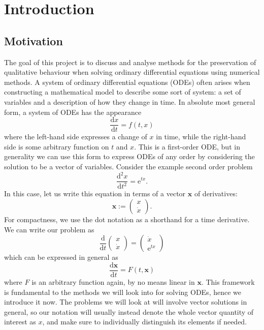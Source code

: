 \documentclass{report}
\theoremstyle{exampstyle} \newtheorem{example}[theorem]{Example}
\theoremstyle{exampstyle} \newtheorem{remark}[theorem]{Remark}
\theoremstyle{exampstyle} \newtheorem{definition}[theorem]{Definition}
\theoremstyle{exampstyle} \newtheorem{lemma}[theorem]{Lemma}
\begin{document}
\chapter{Introduction}

\section{Motivation}

The goal of this project is to discuss and analyse methods for the preservation of qualitative behaviour when solving ordinary differential equations using numerical methods.
A system of ordinary differential equations (ODEs) often arises when constructing a mathematical model to describe some sort of system: a set of variables and a description of how they change in time.
In absolute most general form, a system of ODEs has the appearance
\begin{equation}
    \frac{\mathrm{d}x}{\mathrm{d}t} = f(t,x)
\end{equation}
where the left-hand side expresses a change of $x$ in time, while the right-hand side is some arbitrary function on $t$ and $x$.
This is a first-order ODE, but in generality we can use this form to express ODEs of any order by considering the solution to be a vector of variables.
Consider the example second order problem
\begin{equation*}
    \frac{\mathrm{d}^2 x}{\mathrm{d}t^2} = \mathrm{e}^{tx}.
\end{equation*}
In this case, let us write this equation in terms of a vector $\mathbf{x}$ of derivatives:
\begin{equation*}
    \mathbf{x} := \begin{pmatrix}
        x \\
        \dot{x}
    \end{pmatrix}.
\end{equation*}
For compactness, we use the dot notation as a shorthand for a time derivative.
We can write our problem as
\begin{equation*}
    \frac{\mathrm{d}}{\mathrm{d}t} \begin{pmatrix}
        x \\
        \dot{x}
    \end{pmatrix} = \begin{pmatrix}
        \dot{x} \\
        \mathrm{e}^{tx}
    \end{pmatrix}
\end{equation*}
which can be expressed in general as
\begin{equation*}
    \frac{\mathrm{d}\mathbf{x}}{\mathrm{d}t} = F(t,\mathbf{x})
\end{equation*}
where $F$ is an arbitrary function again, by no means linear in $\mathbf{x}$.
This framework is fundamental to the methods we will look into for solving ODEs, hence we introduce it now.
The problems we will look at will involve vector solutions in general, so our notation will usually instead denote the whole vector quantity of interest as $x$,
and make sure to individually distinguish its elements if needed.
\end{document}

